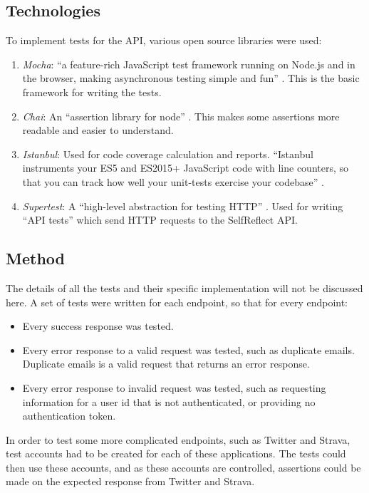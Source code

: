 \documentclass[11pt,openright,a4paper]{report}
\begin{document}
\subsection{Technologies}
To implement tests for the API, various open source libraries were used:
\begin{enumerate}
\item \emph{Mocha}: \enquote{a feature-rich JavaScript test framework running on Node.js and in the browser, making asynchronous testing simple and fun} \parencite{mocha}. This is the basic framework for writing the tests.
\item \emph{Chai}: An \enquote{assertion library for node} \parencite{chai}. This makes some assertions more readable and easier to understand.
\item \emph{Istanbul}: Used for code coverage calculation and reports. \enquote{Istanbul instruments your ES5 and ES2015+ JavaScript code with line counters, so that you can track how well your unit-tests exercise your codebase} \parencite{instanbul}.
\item \emph{Supertest}: A \enquote{high-level abstraction for testing HTTP} \parencite{supertest}. Used for writing \enquote{API tests} which send HTTP requests to the SelfReflect API.
\end{enumerate}

\subsection{Method}
The details of all the tests and their specific implementation will not be discussed here. A set of tests were written for each endpoint, so that for every endpoint:
\begin{itemize}
\item Every success response was tested.
\item Every error response to a valid request was tested, such as duplicate emails. Duplicate emails is a valid request that returns an error response.
\item Every error response to invalid request was tested, such as requesting information for a user id that is not authenticated, or providing no authentication token.
\end{itemize}

In order to test some more complicated endpoints, such as Twitter and Strava, test accounts had to be created for each of these applications. The tests could then use these accounts, and as these accounts are controlled, assertions could be made on the expected response from Twitter and Strava.
\end{document}
